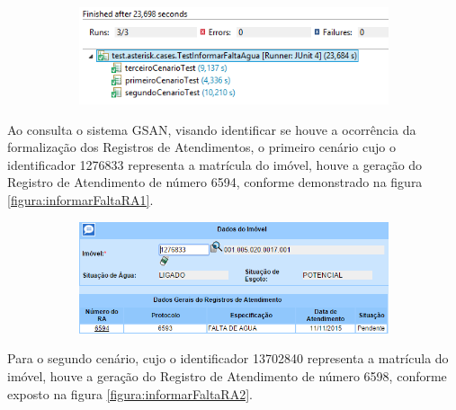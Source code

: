 	\begin{figure}[H]
		\centering
		\caption{\textbf{Informar Falta de Água - Detalhes execução dos testes}}
		\label{figura:informarFaltaJUnit}
		\begin{subfigure}[H]{\textwidth}
			\centering
			\includegraphics{figuras/cenarios/informar_falta_agua/junit_result.PNG}
		\end{subfigure}
	\end{figure}

Ao consulta o sistema GSAN, visando identificar se houve a ocorrência da formalização dos Registros de Atendimentos, o primeiro cenário cujo o identificador 1276833 representa a matrícula do imóvel, houve a geração do Registro de Atendimento de número 6594, conforme demonstrado na figura \ref{figura:informarFaltaRA1}.

\begin{figure}[H]
	\centering
		\caption{\textbf{Informar Falta de Água - RA gerado para o Cenário 1}}
		\label{figura:informarFaltaRA1}
	\begin{subfigure}[H]{\textwidth}
		\centering
		\includegraphics{figuras/cenarios/informar_falta_agua/resultado_1.PNG}
	\end{subfigure}
\end{figure}

	
Para o segundo cenário, cujo o identificador 13702840 representa a matrícula do imóvel, houve a geração do Registro de Atendimento de número 6598, conforme exposto na figura \ref{figura:informarFaltaRA2}.	
		

